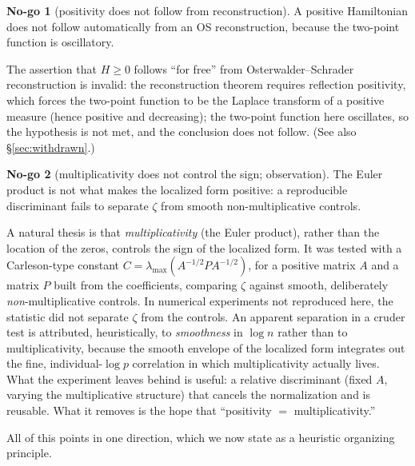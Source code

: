 \documentclass[11pt]{amsart}
\theoremstyle{definition}
\theoremstyle{remark}
\theoremstyle{definition}
\newtheorem{nogo}{No-go}[section]
\begin{document}
\begin{nogo}[positivity does not follow from reconstruction]\label{ng:os}
A positive Hamiltonian does not follow automatically from an OS reconstruction, because the two-point
function is oscillatory.
\end{nogo}
\noindent The assertion that $H\ge0$ follows ``for free'' from
Osterwalder--Schrader reconstruction is invalid: the reconstruction theorem requires
reflection positivity, which forces the two-point function to be the Laplace transform of a positive
measure (hence positive and decreasing); the two-point function here oscillates, so the hypothesis is not met, and the conclusion does not
follow. (See also \S\ref{sec:withdrawn}.)

\begin{nogo}[multiplicativity does not control the sign; observation]\label{ng:mult}
The Euler product is not what makes the localized form positive: a reproducible discriminant fails to
separate $\zeta$ from smooth non-multiplicative controls.
\end{nogo}
\noindent A natural thesis is that \emph{multiplicativity} (the Euler product), rather than the location of
the zeros, controls the sign of the localized form. It was tested with a Carleson-type constant
$C=\lambda_{\max}(A^{-1/2}PA^{-1/2})$, for a positive matrix $A$ and a matrix $P$ built from the
coefficients, comparing $\zeta$ against smooth, deliberately \emph{non}-multiplicative controls. In
numerical experiments not reproduced here, the statistic did not separate $\zeta$ from the controls. An
apparent separation in a cruder test is attributed, heuristically, to \emph{smoothness} in $\log n$ rather
than to multiplicativity, because the smooth envelope of the localized form integrates out the
fine, individual-$\log p$ correlation in which multiplicativity actually lives. What the experiment leaves
behind is useful: a relative discriminant (fixed $A$, varying the multiplicative structure) that cancels the
normalization and is reusable. What it removes is the hope that ``positivity $=$ multiplicativity.''

All of this points in one direction, which we now state as a heuristic organizing principle.
\end{document}
